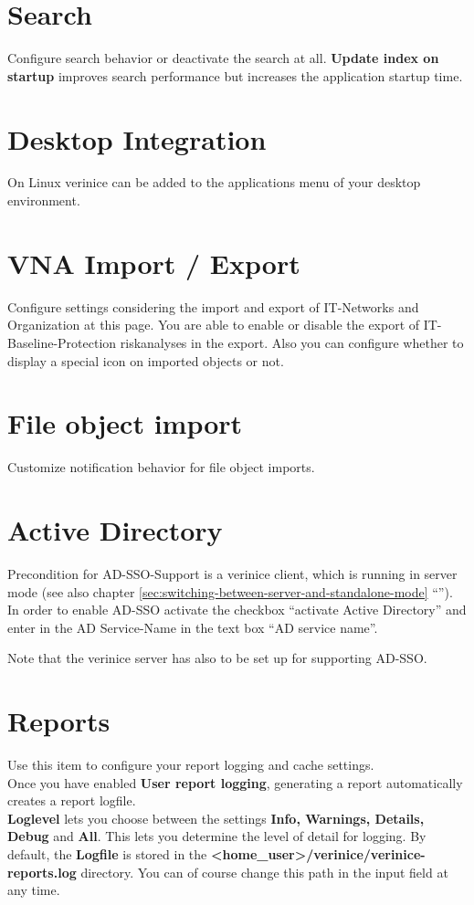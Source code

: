 \documentclass[a4paper,10pt]{book}
\begin{document}
\section{Search}\label{sec:search}
Configure search behavior or deactivate the search at all.
\textbf{Update index on startup} improves search performance but increases
the application startup time.

\section{Desktop Integration}\label{sec:desktop-integration}
On Linux verinice can be added to the applications menu of your desktop environment.

\section{VNA Import / Export}
Configure settings considering the import and export of IT-Networks and Organization at this page. You are able to enable or disable the export of IT-Baseline-Protection riskanalyses
in the export. Also you can configure whether to display a special icon on imported objects or not.

\section{File object import}\label{sec:file-object-import}
Customize notification behavior for file object imports.

\section{Active Directory}
\label{active-directory}

Precondition for AD-SSO-Support is a verinice client, which is running
in server mode (see also chapter
\ref{sec:switching-between-server-and-standalone-mode}
``''). In order
to enable AD-SSO activate the checkbox ``activate Active Directory''
and enter in the AD Service-Name in the text box ``AD service name''.

Note that the verinice server has also to be set up for supporting
AD-SSO.

\section{Reports} \label{Reports}
Use this item to configure your report logging and cache settings.
\newline\\
Once you have enabled \textbf{User report logging}, generating a report automatically creates a report logfile.
\newline\\
\textbf{Loglevel} lets you choose between the settings \textbf{Info, Warnings, Details, Debug} and \textbf{All}.
This lets you determine the level of detail for logging. By default, the \textbf{Logfile} is stored in the
\textbf{\textless home\_user\textgreater /verinice/verinice-reports.log} directory. You can of course change this path in the input field at any time.\\
\end{document}
